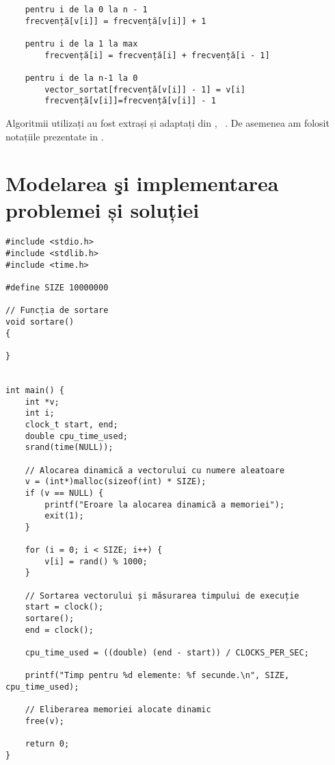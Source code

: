 \documentclass[12pt]{article}
\begin{document}
\begin{description}
\begin{verbatim}
    pentru i de la 0 la n - 1
    frecvență[v[i]] = frecvență[v[i]] + 1
    
    pentru i de la 1 la max
        frecvență[i] = frecvență[i] + frecvență[i - 1]
    
    pentru i de la n-1 la 0
        vector_sortat[frecvență[v[i]] - 1] = v[i]
        frecvență[v[i]]=frecvență[v[i]] - 1
\end{verbatim}
\end{description}


Algoritmii utilizați au fost extrași și adaptați din  \cite{bentley1997fast}, ~\cite{muagureananaliza}. De asemenea am folosit notațiile prezentate in \cite{kristo2020case}.
\section{Modelarea şi implementarea problemei și soluției}
\begin{verbatim}
#include <stdio.h>
#include <stdlib.h>
#include <time.h>

#define SIZE 10000000

// Funcția de sortare
void sortare()
{

}


int main() {
    int *v;
    int i;
    clock_t start, end;
    double cpu_time_used;
    srand(time(NULL));

    // Alocarea dinamică a vectorului cu numere aleatoare
    v = (int*)malloc(sizeof(int) * SIZE);
    if (v == NULL) {
        printf("Eroare la alocarea dinamică a memoriei");
        exit(1);
    }

    for (i = 0; i < SIZE; i++) {
        v[i] = rand() % 1000;
    }

    // Sortarea vectorului și măsurarea timpului de execuție
    start = clock();
    sortare();
    end = clock();

    cpu_time_used = ((double) (end - start)) / CLOCKS_PER_SEC;

    printf("Timp pentru %d elemente: %f secunde.\n", SIZE, cpu_time_used);

    // Eliberarea memoriei alocate dinamic
    free(v);

    return 0;
}

\end{verbatim}
\end{document}

